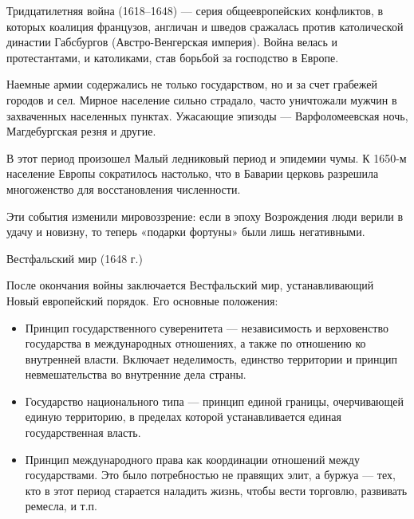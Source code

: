




Тридцатилетняя война (1618–1648) --- серия общеевропейских конфликтов, в которых коалиция французов, англичан и шведов сражалась против католической династии Габсбургов (Австро-Венгерская империя). Война велась и протестантами, и католиками, став борьбой за господство в Европе.

Наемные армии содержались не только государством, но и за счет грабежей городов и сел. Мирное население сильно страдало, часто уничтожали мужчин в захваченных населенных пунктах. Ужасающие эпизоды --- Варфоломеевская ночь, Магдебургская резня и другие.

В этот период произошел Малый ледниковый период и эпидемии чумы. К 1650-м население Европы сократилось настолько, что в Баварии церковь разрешила многоженство для восстановления численности.

Эти события изменили мировоззрение: если в эпоху Возрождения люди верили в удачу и новизну, то теперь «подарки фортуны» были лишь негативными.

Вестфальский мир (1648 г.)

После окончания войны заключается Вестфальский мир, устанавливающий Новый европейский порядок. Его основные положения:

\begin{itemize}
    \item Принцип государственного суверенитета --- независимость и верховенство государства в международных отношениях, а также по отношению ко внутренней власти. Включает неделимость, единство территории и принцип невмешательства во внутренние дела страны.
    \item Государство национального типа --- принцип единой границы, очерчивающей единую территорию, в пределах которой устанавливается единая государственная власть.
    \item Принцип международного права как координации отношений между государствами. Это было потребностью не правящих элит, а буржуа --- тех, кто в этот период старается наладить жизнь, чтобы вести торговлю, развивать ремесла, и т.п.
\end{itemize}

